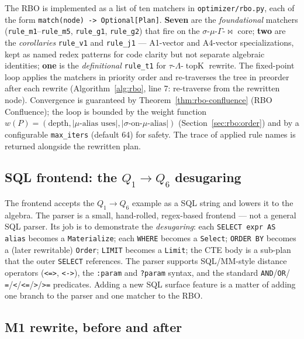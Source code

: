 \documentclass[sigconf,nonacm,review]{acmart}
\theoremstyle{plain}
\theoremstyle{definition}
\newcommand{\topK}{\operatorname{topK}}
\theoremstyle{remark}
\begin{document}
The RBO is implemented as a list of ten matchers in
\texttt{optimizer/rbo.py}, each of the form
\texttt{match(node) -> Optional[Plan]}. \textbf{Seven} are
the \emph{foundational} matchers
(\texttt{rule\_m1}--\texttt{rule\_m5}, \texttt{rule\_g1},
\texttt{rule\_g2}) that fire on the $\sigma$-$\mu$-$\Gamma$-$\bowtie$
core; \textbf{two} are the \emph{corollaries} \texttt{rule\_v1}
and \texttt{rule\_j1} --- A1-vector and A4-vector specializations,
kept as named redex patterns for code clarity but not separate
algebraic identities; \textbf{one} is the \emph{definitional}
\texttt{rule\_t1} for $\tau$-$\Lambda$-$\topK$ rewrite. The
fixed-point loop applies the matchers in priority order and
re-traverses the tree in preorder after each rewrite
(Algorithm~\ref{alg:rbo}, line 7: re-traverse from the rewritten
node). Convergence is guaranteed by
Theorem~\ref{thm:rbo-confluence} (RBO Confluence); the loop
is bounded by the weight function
$w(P) = (\text{depth}, |\mu\text{-alias uses}|,
|\sigma\text{-on-}\mu\text{-alias}|)$
(Section~\ref{sec:rbo:order}) and by a configurable
\texttt{max\_iters} (default 64) for safety. The trace of
applied rule names is returned alongside the rewritten plan.

\subsection{SQL frontend: the $Q_1 \to Q_6$ desugaring}\label{app:proto:sql}

The frontend accepts the $Q_1 \to Q_6$ example as a SQL string
and lowers it to the algebra. The parser is a small,
hand-rolled, regex-based frontend --- not a general SQL parser.
Its job is to demonstrate the \emph{desugaring}: each
\texttt{SELECT expr AS alias} becomes a \texttt{Materialize};
each \texttt{WHERE} becomes a \texttt{Select}; \texttt{ORDER
BY} becomes a (later rewritable) \texttt{Order};
\texttt{LIMIT} becomes a \texttt{Limit}; the CTE body is a
sub-plan that the outer \texttt{SELECT} references. The parser
supports SQL/MM-style distance operators (\texttt{<=>},
\texttt{<->}), the \texttt{:param} and \texttt{?param} syntax,
and the standard \texttt{AND}/\texttt{OR}/
\texttt{=}/\texttt{<}/\texttt{<=}/\texttt{>}/\texttt{>=}
predicates. Adding a new SQL surface feature is a matter of
adding one branch to the parser and one matcher to the RBO.

\subsection{M1 rewrite, before and after}\label{app:proto:m1}
\end{document}

